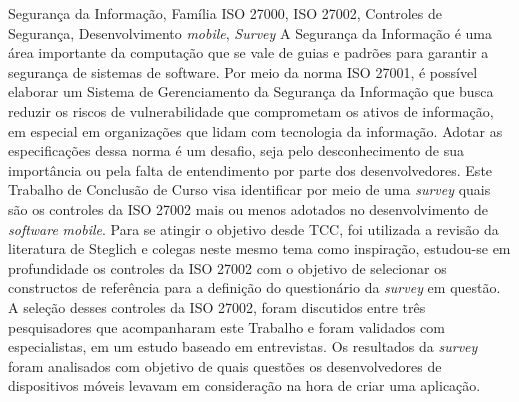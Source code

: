 \documentclass[portuguese,oneside]{tcc}
\begin{document}
\begin{resumo}{Segurança da Informação, Família ISO 27000, ISO 27002, Controles de Segurança, Desenvolvimento \textit{mobile}, \textit{Survey}}
 \vspace{-0.5cm}
 A Segurança da Informação é uma área importante da computação que se vale de guias e padrões para garantir a segurança de sistemas de software. Por meio da norma ISO 27001, é possível elaborar um Sistema de Gerenciamento da Segurança da Informação que busca reduzir os riscos de vulnerabilidade que comprometam os ativos de informação, em especial em organizações que lidam com tecnologia da informação. Adotar as especificações dessa norma é um desafio, seja pelo desconhecimento de sua importância ou pela falta de entendimento por parte dos desenvolvedores. Este Trabalho de Conclusão de Curso visa identificar por meio de uma \textit{survey} quais são os controles da ISO 27002 mais ou menos adotados no desenvolvimento de \textit{software} \textit{mobile}. Para se atingir o objetivo desde TCC, foi utilizada a revisão da literatura de Steglich e colegas \cite{caio2019} neste mesmo tema como inspiração, estudou-se em profundidade os controles da ISO 27002 com o objetivo de selecionar os constructos de referência para a definição do questionário da \textit{survey} em questão.  A seleção desses controles da ISO 27002, foram discutidos entre três pesquisadores que acompanharam este Trabalho e foram validados com especialistas, em um estudo baseado em entrevistas. Os resultados da \textit{survey} foram analisados com objetivo de quais questões os desenvolvedores de dispositivos móveis levavam em consideração na hora de criar uma aplicação.
 

 
 




\end{resumo}
\end{document}
